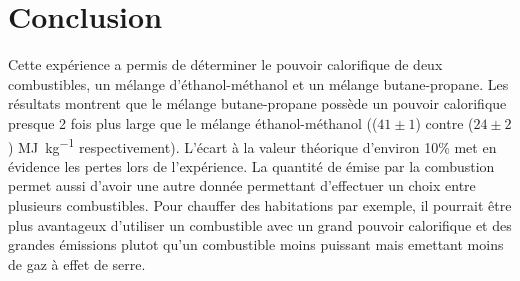 \section{Conclusion}

Cette expérience a permis de déterminer le pouvoir calorifique de deux combustibles, un mélange d'éthanol-méthanol et un mélange butane-propane. Les résultats montrent que le mélange butane-propane possède un pouvoir calorifique presque 2 fois plus large que le mélange éthanol-méthanol ((\(41 \pm 1\)) contre (\(24 \pm 2\)) \si{\mega\joule\per\kilo\gram} respectivement). L'écart à la valeur théorique d'environ 10\% met en évidence les pertes lors de l'expérience. La quantité de  émise par la combustion permet aussi d'avoir une autre donnée permettant d'effectuer un choix entre plusieurs combustibles. Pour chauffer des habitations par exemple, il pourrait être plus avantageux d'utiliser un combustible avec un grand pouvoir calorifique et des grandes émissions plutot qu'un combustible moins puissant mais emettant moins de gaz à effet de serre.